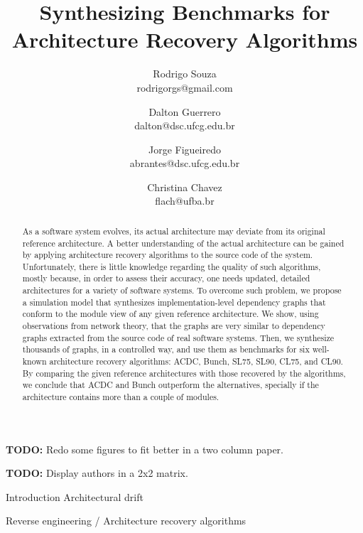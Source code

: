 \documentclass[11pt,twocolumn,a4paper,english]{article}
\title{
Synthesizing Benchmarks for Architecture Recovery Algorithms}
\author{Rodrigo Souza \\ rodrigorgs@gmail.com 
\and Dalton Guerrero \\ dalton@dsc.ufcg.edu.br
\and Jorge Figueiredo \\ abrantes@dsc.ufcg.edu.br
\and Christina Chavez \\ flach@ufba.br
}
\newcommand{\TODO}{\textbf{TODO:} }
\begin{document}
\sloppy
\maketitle

\TODO Redo some figures to fit better in a two column paper.

\TODO Display authors in a 2x2 matrix.


\begin{abstract}
	As a software system evolves, its actual architecture may deviate from its original reference architecture. A better understanding of the actual architecture can be gained by applying architecture recovery algorithms to the source code of the system. Unfortunately, there is little knowledge regarding the quality of such algorithms, mostly because, in order to assess their accuracy, one needs updated, detailed architectures for a variety of software systems.
	To overcome such problem, we propose a simulation model that synthesizes implementation-level dependency graphs that conform to the module view of any given reference architecture. We show, using observations from network theory, that the graphs are very similar to dependency graphs extracted from the source code of real software systems. 
	Then, we synthesize thousands of graphs, in a controlled way, and use them as benchmarks for six well-known architecture recovery algorithms: ACDC, Bunch, SL75, SL90, CL75, and CL90. By comparing the given reference architectures with those recovered by the algorithms, we conclude that ACDC and Bunch outperform the alternatives, specially if the architecture contains more than a couple of modules.\end{abstract}


\begin{section}{Introduction}
	Architectural drift

	Reverse engineering / Architecture recovery algorithms
	
\end{section}
\end{document}
